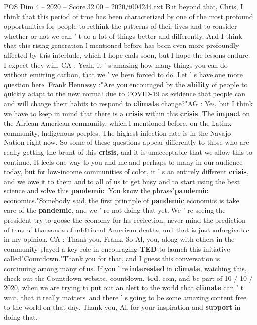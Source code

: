 \begin{textsample}{POS Dim 4 – 2020 – Score 32.00 – 2020/t004244.txt}
But beyond that, Chris, I think that this period of time has been characterized by one of the most profound opportunities for people to rethink the patterns of their lives and to consider whether or not we can ' t do a lot of things better and differently.
And I think that this rising generation I mentioned before has been even more profoundly affected by this interlude, which I hope ends soon, but I hope the lessons endure.
I expect they will.
CA : Yeah, it ' s amazing how many things you can do without emitting carbon, that we ' ve been forced to do.
Let ' s have one more question here.
Frank Hennessy :"Are you encouraged by the \textbf{ability} of people to quickly adapt to the new normal due to COVID-19 as evidence that people can and will change their habits to respond to \textbf{climate} change?"AG : Yes, but I think we have to keep in mind that there is a \textbf{crisis} within this \textbf{crisis}.
The \textbf{impact} on the African American community, which I mentioned before, on the Latinx community, Indigenous peoples.
The highest infection rate is in the Navajo Nation right now.
So some of these questions appear differently to those who are really getting the brunt of this \textbf{crisis}, and it is unacceptable that we allow this to continue.
It feels one way to you and me and perhaps to many in our audience today, but for low-income communities of color, it ' s an entirely different \textbf{crisis}, and we owe it to them and to all of us to get busy and to start using the best science and solve this \textbf{pandemic}.
You know the phrase"\textbf{pandemic} economics."Somebody said, the first principle of \textbf{pandemic} economics is take care of the \textbf{pandemic}, and we ' re not doing that yet.
We ' re seeing the president try to goose the economy for his reelection, never mind the prediction of tens of thousands of additional American deaths, and that is just unforgivable in my opinion.
CA : Thank you, Frank.
So Al, you, along with others in the community played a key role in encouraging \textbf{TED} to launch this initiative called"Countdown."Thank you for that, and I guess this conversation is continuing among many of us.
If you ' re \textbf{interested} in \textbf{climate}, watching this, check out the Countdown website, countdown. \textbf{ted}. com, and be part of 10 / 10 / 2020, when we are trying to put out an alert to the world that \textbf{climate} can ' t wait, that it really matters, and there ' s going to be some amazing content free to the world on that day.
Thank you, Al, for your inspiration and \textbf{support} in doing that.

\end{textsample}

